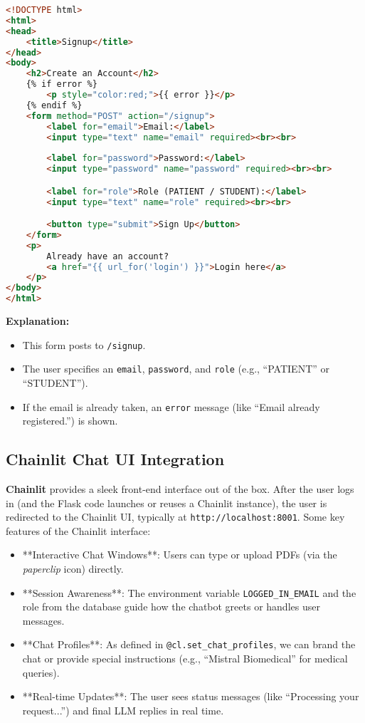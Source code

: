 \begin{lstlisting}[language=HTML, caption={signup.html (Flask Template)}, basicstyle=\small\ttfamily]
<!DOCTYPE html>
<html>
<head>
    <title>Signup</title>
</head>
<body>
    <h2>Create an Account</h2>
    {% if error %}
        <p style="color:red;">{{ error }}</p>
    {% endif %}
    <form method="POST" action="/signup">
        <label for="email">Email:</label>
        <input type="text" name="email" required><br><br>
        
        <label for="password">Password:</label>
        <input type="password" name="password" required><br><br>

        <label for="role">Role (PATIENT / STUDENT):</label>
        <input type="text" name="role" required><br><br>

        <button type="submit">Sign Up</button>
    </form>
    <p>
        Already have an account? 
        <a href="{{ url_for('login') }}">Login here</a>
    </p>
</body>
</html>
\end{lstlisting}

\noindent\textbf{Explanation:}
\begin{itemize}
    \item This form posts to \texttt{/signup}.
    \item The user specifies an \texttt{email}, \texttt{password}, and \texttt{role} (e.g., “PATIENT” or “STUDENT”).
    \item If the email is already taken, an \texttt{error} message (like ``Email already registered.'') is shown.
\end{itemize}

\subsection{Chainlit Chat UI Integration}

\textbf{Chainlit} provides a sleek front-end interface out of the box. After the user logs in (and the Flask code launches or reuses a Chainlit instance), the user is redirected to the Chainlit UI, typically at \texttt{http://localhost:8001}. Some key features of the Chainlit interface:

\begin{itemize}
    \item **Interactive Chat Windows**: Users can type or upload PDFs (via the \emph{paperclip} icon) directly. 
    \item **Session Awareness**: The environment variable \texttt{LOGGED\_IN\_EMAIL} and the role from the database guide how the chatbot greets or handles user messages.
    \item **Chat Profiles**: As defined in \texttt{@cl.set\_chat\_profiles}, we can brand the chat or provide special instructions (e.g., “Mistral Biomedical” for medical queries).
    \item **Real-time Updates**: The user sees status messages (like “Processing your request...”) and final LLM replies in real time.
\end{itemize}


